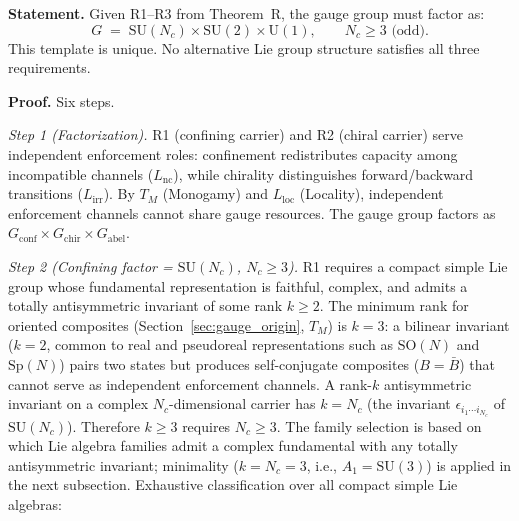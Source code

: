\documentclass[11pt]{article}
\newcommand{\SU}{\mathrm{SU}}
\newcommand{\U}{\mathrm{U}}
\begin{document}
\begin{tcolorbox}[apfbox, title={Lemma $L_{\mathrm{gauge,unique}}$ (Gauge Template Uniqueness)}]
\textbf{Statement.}  Given R1--R3 from Theorem~R, the gauge group must factor as:
\begin{equation}
G \;=\; \SU(N_c) \times \SU(2) \times \U(1), \qquad N_c \ge 3 \text{ (odd)}.
\label{eq:gauge_template}
\end{equation}
This template is unique.  No alternative Lie group structure satisfies all three requirements.

\smallskip\noindent\textbf{Proof.}  Six steps.

\medskip\noindent\textit{Step 1 (Factorization).}  R1 (confining carrier) and R2 (chiral carrier) serve independent enforcement roles: confinement redistributes capacity among incompatible channels ($L_{\mathrm{nc}}$), while chirality distinguishes forward/backward transitions ($L_{\mathrm{irr}}$).  By $T_M$ (Monogamy) and $L_{\mathrm{loc}}$ (Locality), independent enforcement channels cannot share gauge resources.  The gauge group factors as $G_{\mathrm{conf}} \times G_{\mathrm{chir}} \times G_{\mathrm{abel}}$.

\medskip\noindent\textit{Step 2 (Confining factor = $\SU(N_c)$, $N_c \ge 3$).}  R1 requires a compact simple Lie group whose fundamental representation is faithful, complex, and admits a totally antisymmetric invariant of some rank $k \ge 2$.  The minimum rank for oriented composites (Section~\ref{sec:gauge_origin}, $T_M$) is $k = 3$: a bilinear invariant ($k=2$, common to real and pseudoreal representations such as $\mathrm{SO}(N)$ and $\mathrm{Sp}(N)$) pairs two states but produces self-conjugate composites ($B = \bar{B}$) that cannot serve as independent enforcement channels.  A rank-$k$ antisymmetric invariant on a complex $N_c$-dimensional carrier has $k = N_c$ (the invariant $\epsilon_{i_1 \cdots i_{N_c}}$ of $\SU(N_c)$).  Therefore $k \ge 3$ requires $N_c \ge 3$.  The family selection is based on which Lie algebra families admit a complex fundamental with any totally antisymmetric invariant; minimality ($k = N_c = 3$, i.e., $A_1 = \SU(3)$) is applied in the next subsection.  Exhaustive classification over all compact simple Lie algebras:


\end{tcolorbox}
\end{document}
